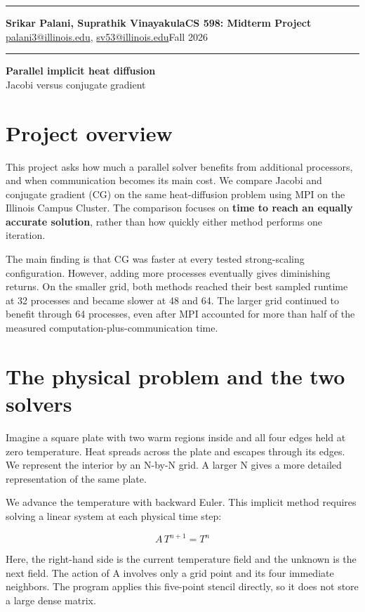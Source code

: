 \documentclass[11pt]{article}
\begin{document}
\noindent\rule{\linewidth}{2pt}
{\large\textbf{Srikar Palani, Suprathik Vinayakula}}\hfill\textbf{CS 598: Midterm Project}\\
\href{mailto:palani3@illinois.edu}{palani3@illinois.edu},
\href{mailto:sv53@illinois.edu}{sv53@illinois.edu}\hfill Fall 2026\\[-3pt]
\noindent\rule{\linewidth}{2pt}
\begin{center}
{\Large\bfseries Parallel implicit heat diffusion}\\[3pt]
{\large Jacobi versus conjugate gradient}
\end{center}
\section{Project overview}

This project asks how much a parallel solver benefits from additional processors, and when communication becomes its main cost. We compare Jacobi and conjugate gradient (CG) on the same heat-diffusion problem using MPI on the Illinois Campus Cluster. The comparison focuses on \textbf{time to reach an equally accurate solution}, rather than how quickly either method performs one iteration.

The main finding is that CG was faster at every tested strong-scaling configuration. However, adding more processes eventually gives diminishing returns. On the smaller grid, both methods reached their best sampled runtime at 32 processes and became slower at 48 and 64. The larger grid continued to benefit through 64 processes, even after MPI accounted for more than half of the measured computation-plus-communication time.

\section{The physical problem and the two solvers}

Imagine a square plate with two warm regions inside and all four edges held at zero temperature. Heat spreads across the plate and escapes through its edges. We represent the interior by an N-by-N grid. A larger N gives a more detailed representation of the same plate.

We advance the temperature with backward Euler. This implicit method requires solving a linear system at each physical time step:

\[
A\,T^{n+1}=T^n
\]

Here, the right-hand side is the current temperature field and the unknown is the next field. The action of A involves only a grid point and its four immediate neighbors. The program applies this five-point stencil directly, so it does not store a large dense matrix.
\end{document}
